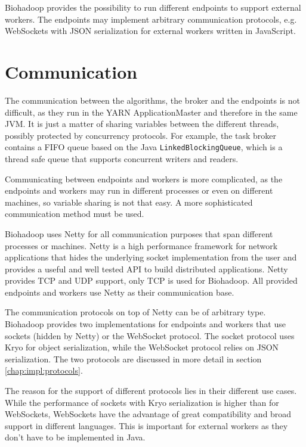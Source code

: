 Biohadoop provides the possibility to run different endpoints to support external workers. The endpoints may implement arbitrary communication protocols, e.g. WebSockets with JSON serialization for external workers written in JavaScript.

\section{Communication}
\label{chap:impl:communication}
The communication between the algorithms, the broker and the endpoints is not difficult, as they run in the YARN ApplicationMaster and therefore in the same JVM. It is just a matter of sharing variables between the different threads, possibly protected by concurrency protocols. For example, the task broker contains a FIFO queue based on the Java \texttt{LinkedBlockingQueue}, which is a thread safe queue that supports concurrent writers and readers.
  
Communicating between endpoints and workers is more complicated, as the endpoints and workers may run in different processes or even on different machines, so variable sharing is not that easy. A more sophisticated communication method must be used.

Biohadoop uses Netty \cite{netty} for all communication purposes that span different processes or machines. Netty is a high performance framework for network applications that hides the underlying socket implementation from the user and provides a useful and well tested API to build distributed applications. Netty provides TCP and UDP support, only TCP is used for Biohadoop. All provided endpoints and workers use Netty as their communication base.

The communication protocols on top of Netty can be of arbitrary type. Biohadoop provides two implementations for endpoints and workers that use sockets (hidden by Netty) or the WebSocket protocol. The socket protocol uses Kryo \cite{kryo} for object serialization, while the WebSocket protocol relies on JSON serialization. The two protocols are discussed in more detail in section \ref{chap:impl:protocols}.

The reason for the support of different protocols lies in their different use cases. While the performance of sockets with Kryo serialization is higher than for WebSockets, WebSockets have the advantage of great compatibility and broad support in different languages. This is important for external workers as they don't have to be implemented in Java.

